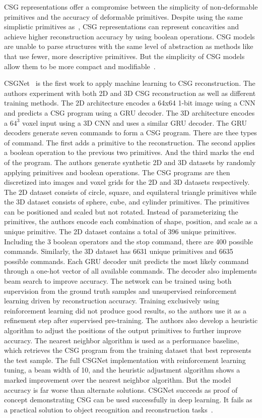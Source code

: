 CSG representations offer a compromise between the simplicity of non-deformable primitives and the accuracy of deformable primitives. Despite using the same simplistic primitives as~\cite{Li2019}, CSG representations can represent concavities and achieve higher reconstruction accuracy by using boolean operations. CSG models are unable to parse structures with the same level of abstraction as methods like~\cite{Paschalidou2021} that use fewer, more descriptive primitives. But the simplicity of CSG models allow them to be more compact and modifiable~\cite{Paschalidou2021}.

CSGNet~\cite{Sharma2018} is the first work to apply machine learning to CSG reconstruction. The authors experiment with both 2D and 3D CSG reconstruction as well as different training methods. The 2D architecture encodes a 64x64 1-bit image using a CNN and predicts a CSG program using a GRU decoder. The 3D architecture encodes a $64^3$ voxel input using a 3D CNN and uses a similar GRU decoder. The GRU decoders generate seven commands to form a CSG program. There are thee types of command. The first adds a primitive to the reconstruction. The second applies a boolean operation to the previous two primitives. And the third marks the end of the program. The authors generate synthetic 2D and 3D datasets by randomly applying primitives and boolean operations. The CSG programs are then discretized into images and voxel grids for the 2D and 3D datasets respectively. The 2D dataset consists of circle, square, and equilateral triangle primitives while the 3D dataset consists of sphere, cube, and cylinder primitives. The primitives can be positioned and scaled but not rotated. Instead of parameterizing the primitives, the authors encode each combination of shape, position, and scale as a unique primitive. The 2D dataset contains a total of 396 unique primitives. Including the 3 boolean operators and the stop command, there are 400 possible commands. Similarly, the 3D dataset has 6631 unique primitives and 6635 possible commands. Each GRU decoder unit predicts the most likely command through a one-hot vector of all available commands. The decoder also implements beam search to improve accuracy. The network can be trained using both supervision from the ground truth samples and unsupervised reinforcement learning driven by reconstruction accuracy. Training exclusively using reinforcement learning did not produce good results, so the authors use it as a refinement step after supervised pre-training. The authors also develop a heuristic algorithm to adjust the positions of the output primitives to further improve accuracy. The nearest neighbor algorithm is used as a performance baseline, which retrieves the CSG program from the training dataset that best represents the test sample. The full CSGNet implementation with reinforcement learning tuning, a beam width of 10, and the heuristic adjustment algorithm shows a marked improvement over the nearest neighbor algorithm. But the model accuracy is far worse than alternate solutions. CSGNet succeeds as proof of concept demonstrating CSG can be used successfully in deep learning. It fails as a practical solution to object recognition and reconstruction tasks~\cite{Sharma2018}.

